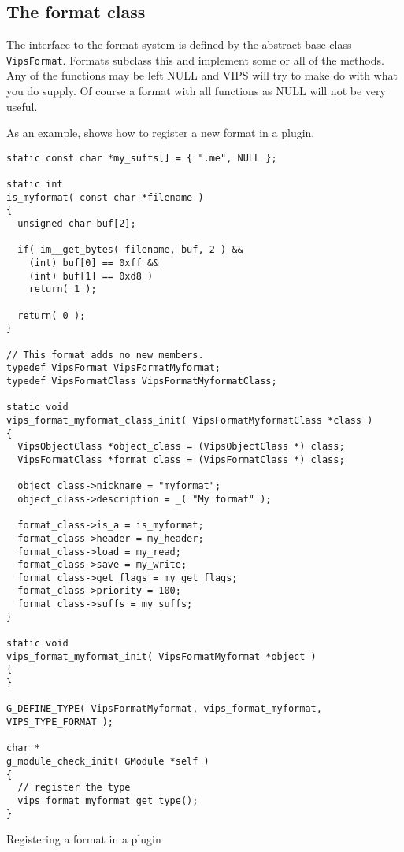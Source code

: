 \subsection{The format class}

The interface to the format system is defined by the abstract base class
\verb+VipsFormat+. Formats subclass this and implement some or all of the
methods. Any of the functions may be left NULL and VIPS will try to make do 
with what you do supply. Of course a format with all functions as NULL will 
not be very useful.

As an example,  shows how to register a new format in a
plugin.

\begin{fig2}
\begin{verbatim}
static const char *my_suffs[] = { ".me", NULL };

static int
is_myformat( const char *filename )
{
  unsigned char buf[2];

  if( im__get_bytes( filename, buf, 2 ) &&
    (int) buf[0] == 0xff && 
    (int) buf[1] == 0xd8 )
    return( 1 );

  return( 0 );
}

// This format adds no new members.
typedef VipsFormat VipsFormatMyformat;
typedef VipsFormatClass VipsFormatMyformatClass;

static void
vips_format_myformat_class_init( VipsFormatMyformatClass *class )
{
  VipsObjectClass *object_class = (VipsObjectClass *) class;
  VipsFormatClass *format_class = (VipsFormatClass *) class;

  object_class->nickname = "myformat";
  object_class->description = _( "My format" );

  format_class->is_a = is_myformat;
  format_class->header = my_header;
  format_class->load = my_read;
  format_class->save = my_write;
  format_class->get_flags = my_get_flags;
  format_class->priority = 100;
  format_class->suffs = my_suffs;
}

static void
vips_format_myformat_init( VipsFormatMyformat *object )
{
}

G_DEFINE_TYPE( VipsFormatMyformat, vips_format_myformat, VIPS_TYPE_FORMAT );

char *
g_module_check_init( GModule *self )
{
  // register the type
  vips_format_myformat_get_type(); 
}
\end{verbatim}
\caption{Registering a format in a plugin}
\label{fg:newformat}
\end{fig2}

